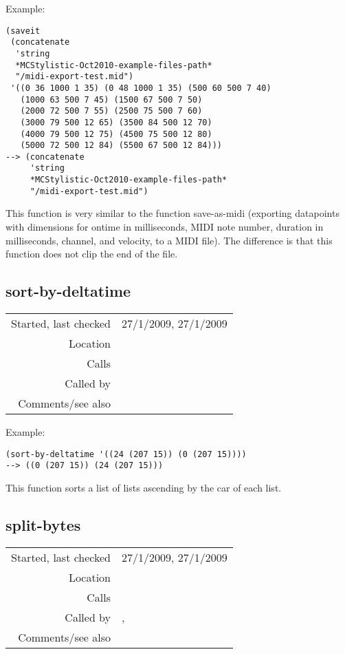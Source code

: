 \vspace{0.5cm}
\noindent Example:
\begin{verbatim}
(saveit
 (concatenate
  'string
  *MCStylistic-Oct2010-example-files-path*
  "/midi-export-test.mid")
 '((0 36 1000 1 35) (0 48 1000 1 35) (500 60 500 7 40)
   (1000 63 500 7 45) (1500 67 500 7 50)
   (2000 72 500 7 55) (2500 75 500 7 60)
   (3000 79 500 12 65) (3500 84 500 12 70)
   (4000 79 500 12 75) (4500 75 500 12 80)
   (5000 72 500 12 84) (5500 67 500 12 84)))
--> (concatenate
     'string
     *MCStylistic-Oct2010-example-files-path*
     "/midi-export-test.mid")
\end{verbatim}

\noindent This function is very similar to the
function save-as-midi (exporting datapoints with
dimensions for ontime in milliseconds, MIDI note
number, duration in milliseconds, channel, and
velocity, to a MIDI file). The difference is that this
function does not clip the end of the file.


\subsection*{sort-by-deltatime}\label{fun:sort-by-deltatime}

\vspace{0.3cm}
\begin{tabular}{r|p{8cm}}
Started, last checked & 27/1/2009, 27/1/2009 \\
Location & \nameref{sec:MIDI-export} \\
Calls & \\
Called by & \nameref{fun:create-MTrk} \\
Comments/see also &
\end{tabular}

\vspace{0.5cm}
\noindent Example:
\begin{verbatim}
(sort-by-deltatime '((24 (207 15)) (0 (207 15))))
--> ((0 (207 15)) (24 (207 15)))
\end{verbatim}

\noindent This function sorts a list of lists
ascending by the car of each list.


\subsection*{split-bytes}\label{fun:split-bytes}

\vspace{0.3cm}
\begin{tabular}{r|p{8cm}}
Started, last checked & 27/1/2009, 27/1/2009 \\
Location & \nameref{sec:MIDI-export} \\
Calls & \nameref{fun:get-byte} \\
Called by & \nameref{fun:create-MTrk}, \nameref{fun:create-tempo-track} \\
Comments/see also &
\end{tabular}

